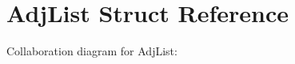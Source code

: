 \hypertarget{structAdjList}{}\section{Adj\+List Struct Reference}
\label{structAdjList}


Collaboration diagram for Adj\+List\+:
